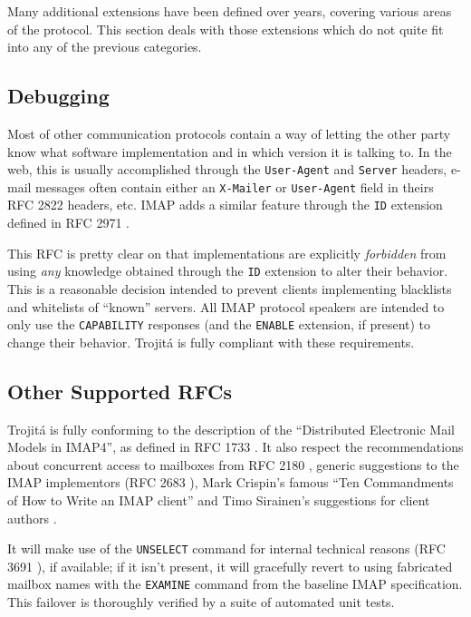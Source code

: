 \documentclass[trojita]{subfiles}
\begin{document}
Many additional extensions have been defined over years, covering various areas of the protocol.  This section deals
with those extensions which do not quite fit into any of the previous categories.

\subsection{Debugging}

Most of other communication protocols contain a way of letting the other party know what software implementation and in
which version it is talking to.  In the web, this is usually accomplished through the {\tt User-Agent} and {\tt Server}
headers, e-mail messages often contain either an {\tt X-Mailer} or {\tt User-Agent} field in theirs RFC 2822 headers,
etc.  IMAP adds a similar feature through the {\tt ID} extension defined in RFC 2971 \cite{rfc2971}.

This RFC is pretty clear on that implementations are explicitly {\em forbidden} from using {\em any} knowledge obtained
through the {\tt ID} extension to alter their behavior.  This is a reasonable decision intended to prevent clients
implementing blacklists and whitelists of ``known'' servers.  All IMAP protocol speakers are intended to only use the
{\tt CAPABILITY} responses (and the {\tt ENABLE} extension, if present) to change their behavior.  Trojitá is fully
compliant with these requirements.

\subsection{Other Supported RFCs}

Trojitá is fully conforming to the description of the ``Distributed Electronic Mail Models in IMAP4'', as defined in RFC
1733 \cite{rfc1733}.  It also respect the recommendations about concurrent access to mailboxes from RFC 2180
\cite{rfc2180}, generic suggestions to the IMAP implementors (RFC 2683 \cite{rfc2683}), Mark Crispin's famous ``Ten
Commandments of How to Write an IMAP client'' \cite{crispin-ten-commandments} and Timo Sirainen's suggestions for client
authors \cite{tss-client-coding-howto} \cite{imapwiki-client-best-practices}.

It will make use of the {\tt UNSELECT} command for internal technical reasons (RFC 3691 \cite{rfc3691}), if available;
if it isn't present, it will gracefully revert to using fabricated mailbox names with the {\tt EXAMINE} command from the
baseline IMAP specification.  This failover is thoroughly verified by a suite of automated unit tests.
\end{document}
